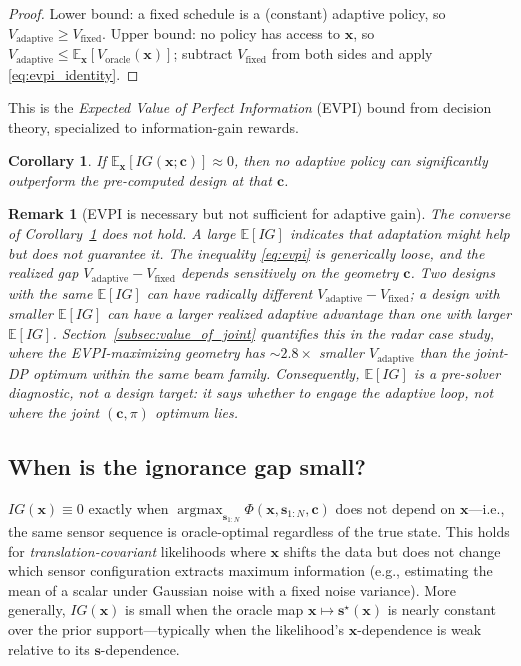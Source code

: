 \documentclass[11pt,a4paper]{article}
\newcommand{\E}{\mathbb{E}}
\newcommand{\argmax}{\operatorname{argmax}}
\newtheorem{corollary}{Corollary}
\newtheorem{remark}{Remark}
\begin{document}
\begin{proof}
Lower bound: a fixed schedule is a (constant) adaptive policy, so $V_{\mathrm{adaptive}} \ge V_{\mathrm{fixed}}$.  Upper bound: no policy has access to $\bm{x}$, so $V_{\mathrm{adaptive}} \le \E_{\bm{x}}[V_{\mathrm{oracle}}(\bm{x})]$; subtract $V_{\mathrm{fixed}}$ from both sides and apply \eqref{eq:evpi_identity}.
\end{proof}

This is the \emph{Expected Value of Perfect Information} (EVPI) bound from decision theory, specialized to information-gain rewards.

\begin{corollary}
\label{cor:useless_adapt}
If $\E_{\bm{x}}[IG(\bm{x}; \bm{c})] \approx 0$, then no adaptive policy can significantly outperform the pre-computed design at that $\bm{c}$.
\end{corollary}

\begin{remark}[EVPI is necessary but not sufficient for adaptive gain]
\label{rem:evpi_necessary_not_sufficient}
The converse of Corollary~\ref{cor:useless_adapt} does \emph{not} hold.  A large $\E[IG]$ indicates that adaptation \emph{might} help but does not guarantee it.  The inequality \eqref{eq:evpi} is generically loose, and the realized gap $V_{\mathrm{adaptive}} - V_{\mathrm{fixed}}$ depends sensitively on the geometry $\bm{c}$.  Two designs with the same $\E[IG]$ can have radically different $V_{\mathrm{adaptive}} - V_{\mathrm{fixed}}$; a design with smaller $\E[IG]$ can have a \emph{larger} realized adaptive advantage than one with larger $\E[IG]$.  Section~\ref{subsec:value_of_joint} quantifies this in the radar case study, where the EVPI-maximizing geometry has $\sim\!2.8\times$ \emph{smaller} $V_{\mathrm{adaptive}}$ than the joint-DP optimum within the same beam family.  Consequently, $\E[IG]$ is a pre-solver diagnostic, not a design target: it says \emph{whether} to engage the adaptive loop, not \emph{where} the joint $(\bm{c}, \pi)$ optimum lies.
\end{remark}

\subsection{When is the ignorance gap small?}

$IG(\bm{x}) \equiv 0$ exactly when $\argmax_{\bm{s}_{1:N}} \Phi(\bm{x}, \bm{s}_{1:N}, \bm{c})$ does not depend on $\bm{x}$---i.e., the same sensor sequence is oracle-optimal regardless of the true state.  This holds for \emph{translation-covariant} likelihoods where $\bm{x}$ shifts the data but does not change which sensor configuration extracts maximum information (e.g., estimating the mean of a scalar under Gaussian noise with a fixed noise variance).  More generally, $IG(\bm{x})$ is small when the oracle map $\bm{x} \mapsto \bm{s}^\star(\bm{x})$ is nearly constant over the prior support---typically when the likelihood's $\bm{x}$-dependence is weak relative to its $\bm{s}$-dependence.
\end{document}
